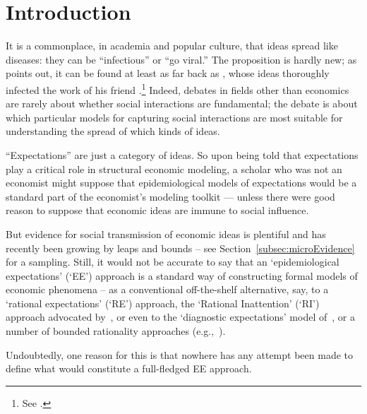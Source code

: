 \section{Introduction}
\label{chap1:sec1}

It is a commonplace, in academia and popular culture, that ideas spread like diseases: they can be ``infectious'' or ``go viral.''  The proposition is hardly new; as \cite{shiller2017narrative} points out, it can be found at least as far back as \cite{humeenquiry},
 whose ideas thoroughly infected the work of his friend \cite{smithwealth}.\footnote{See \cite{rasmussen2017infidel}.} Indeed, %
 debates in fields other than economics are rarely about whether social interactions are fundamental; the debate is about which particular models for capturing social interactions are most suitable for understanding the spread of which kinds of ideas.

``Expectations'' are just a category of ideas.  So upon being told that expectations play a critical role in structural economic modeling, a scholar who was not an economist might suppose that epidemiological models of  expectations would be a standard part of the economist's modeling toolkit --- unless there were good reason to suppose that economic ideas are immune to social influence.

But evidence for social transmission of economic ideas is plentiful and has recently been growing by leaps and bounds -- see Section~\ref{subsec:microEvidence} for a sampling.  Still, it would not be accurate to say that an `epidemiological expectations' (`EE') approach is a standard way of constructing formal models of economic phenomena -- as a conventional off-the-shelf alternative, say, to a `rational expectations' (`RE') approach, the `Rational Inattention' (`RI') approach advocated by~\cite{sims2003implications}, or even to the `diagnostic expectations' model of~\cite{bordalo2018diagnostic}, or a number of bounded rationality approaches (e.g.,~\cite{gabaix2020behavioral}).

Undoubtedly, one reason for this is that nowhere has any attempt been made to define what would constitute a full-fledged EE approach.

